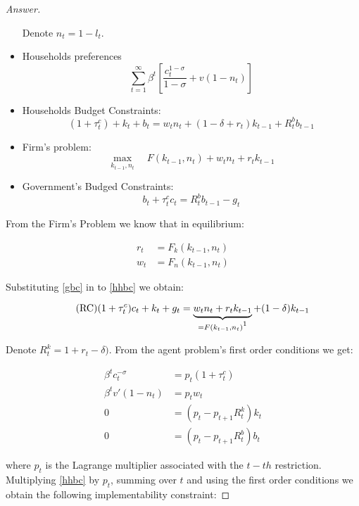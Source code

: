 \documentclass[12pt]{article}
\theoremstyle{definition}
\begin{document}
\begin{proof}[Answer]
\begin{itemize}
    Denote $n_t = 1-l_t$.
    \item Households preferences $$\sum_{t=1}^{\infty}\beta^t \left[\frac{c_t^{1-\sigma}}{1-\sigma} + v(1-n_t)\right]$$
    \item Households Budget Constraints:
    \begin{equation}\tag{HHBC}\label{hhbc}(1+\tau^c_t)+k_t + b_t = w_tn_t+(1-\delta+r_t)k_{t-1}+R^b_t b_{t-1}\end{equation}
    \item Firm's problem:$$\max_{k_{t-1},n_t}\quad F(k_{t-1}, n_t) + w_tn_t+r_tk_{t-1}$$
    \item Government's Budged Constraints:\begin{equation}\tag{GBC}\label{gbc}b_t + \tau_{t}^c c_t = R^b_t b_{t-1} -g_t \end{equation}
\end{itemize}

From the Firm's Problem we know that in equilibrium:

\begin{align*}
    r_t &= F_k(k_{t-1}, n_t)\\
    w_t &= F_n(k_{t-1}, n_t)
\end{align*}

Substituting \eqref{gbc} in to \eqref{hhbc} we obtain:

 \begin{equation}\tag{RC}\label{rc}(1+\tau^c_t)c_t+k_t + g_t = \underbrace{w_tn_t+r_t k_{t-1}}_{=F(k_{t-1}, n_t)\footnotemark} + (1-\delta)k_{t-1}\end{equation}

Denote $R^k_t = 1+r_t-\delta)$. From the agent problem's first order conditions we get:

\begin{align*}
    \beta^t c_t^{-\sigma} &= p_t(1+\tau_t^c)\\
    \beta^t v'(1-n_t) &= p_tw_t\\
    0& = (p_t - p_{t+1}R^k_t)k_t\\
    0& = (p_t - p_{t+1}R^b_t)b_t
\end{align*}

where $p_t$ is the Lagrange multiplier associated with the $t-th$ restriction. Multiplying \eqref{hhbc} by $p_t$, summing over $t$ and using the first order conditions we obtain the following implementability constraint:


\end{proof}
\end{document}
